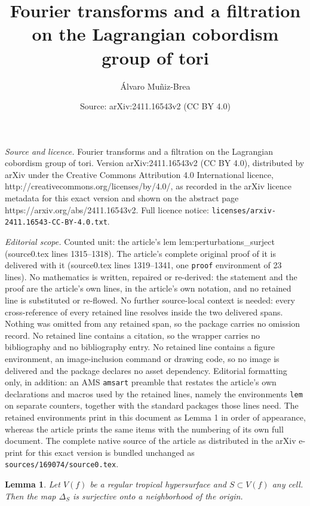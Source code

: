 \documentclass[10pt,a4paper]{amsart}
\title{Fourier transforms and a filtration on the Lagrangian cobordism group of tori}
\author{\'Alvaro Mu\~niz-Brea}
\date{Source: arXiv:2411.16543v2 (CC BY 4.0)}
\newtheorem{lem}{Lemma}
\begin{document}
\maketitle

\noindent\emph{Source and licence.} Fourier transforms and a filtration on the Lagrangian cobordism group of tori. Version arXiv:2411.16543v2 (CC BY 4.0), distributed by arXiv under the Creative Commons Attribution 4.0 International licence, http://creativecommons.org/licenses/by/4.0/, as recorded in the arXiv licence metadata for this exact version and shown on the abstract page https://arxiv.org/abs/2411.16543v2. Full licence notice: \texttt{licenses/arxiv-2411.16543-CC-BY-4.0.txt}.\par\smallskip

\noindent\textit{Editorial scope.} Counted unit: the article's lem lem:perturbations\_surject (source0.tex lines 1315--1318). The article's complete original proof of it is delivered with it (source0.tex lines 1319--1341, one \texttt{proof} environment of 23 lines). No mathematics is written, repaired or re-derived: the statement and the proof are the article's own lines, in the article's own notation, and no retained line is substituted or re-flowed.  No further source-local context is needed: every cross-reference of every retained line resolves inside the two delivered spans.  Nothing was omitted from any retained span, so the package carries no omission record.  No retained line contains a citation, so the wrapper carries no bibliography and no bibliography entry.  No retained line contains a figure environment, an image-inclusion command or drawing code, so no image is delivered and the package declares no asset dependency.  Editorial formatting only, in addition: an AMS \texttt{amsart} preamble that restates the article's own declarations and macros used by the retained lines, namely the environments \texttt{lem} on separate counters, together with the standard packages those lines need.  The retained environments print in this document as Lemma 1 in order of appearance, whereas the article prints the same items with the numbering of its own full document.  The complete native source of the article as distributed in the arXiv e-print for this exact version is bundled unchanged as \texttt{sources/169074/source0.tex}.
\begin{lem}\label{lem:perturbations_surject}
    Let $V(f)$ be a regular tropical hypersurface and $S \subset V(f)$ any cell.
    Then the map $\Delta_S$ is surjective onto a neighborhood of the origin.
\end{lem}
\end{document}
